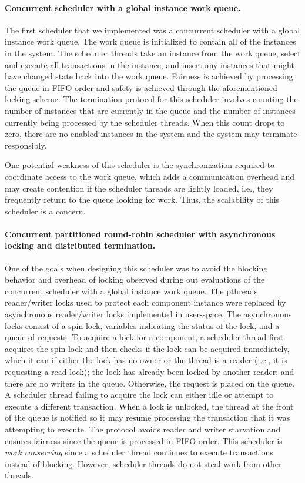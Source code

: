 \paragraph{Concurrent scheduler with a global instance work queue.}
The first scheduler that we implemented was a concurrent scheduler with a global instance work queue.
The work queue is initialized to contain all of the instances in the system.
The scheduler threads take an instance from the work queue, select and execute all transactions in the instance, and insert any instances that might have changed state back into the work queue.
Fairness is achieved by processing the queue in FIFO order and safety is achieved through the aforementioned locking scheme.
The termination protocol for this scheduler involves counting the number of instances that are currently in the queue and the number of instances currently being processed by the scheduler threads.
When this count drops to zero, there are no enabled instances in the system and the system may terminate responsibly.

One potential weakness of this scheduler is the synchronization required to coordinate access to the work queue, which adds a communication overhead and may create contention if the scheduler threads are lightly loaded, i.e., they frequently return to the queue looking for work.
Thus, the scalability of this scheduler is a concern.

\paragraph{Concurrent partitioned round-robin scheduler with asynchronous locking and distributed termination.}
One of the goals when designing this scheduler was to avoid the blocking behavior and overhead of locking observed during out evaluations of the concurrent scheduler with a global instance work queue.
The pthreads reader/writer locks used to protect each component instance were replaced by asynchronous reader/writer locks implemented in user-space.
The asynchronous locks consist of a spin lock, variables indicating the status of the lock, and a queue of requests.
To acquire a lock for a component, a scheduler thread first acquires the spin lock and then checks if the lock can be acquired immediately, which it can if either the lock has no owner or the thread is a reader (i.e., it is requesting a read lock); the lock has already been locked by another reader; and there are no writers in the queue.
Otherwise, the request is placed on the queue.
A scheduler thread failing to acquire the lock can either idle or attempt to execute a different transaction.
When a lock is unlocked, the thread at the front of the queue is notified so it may resume processing the transaction that it was attempting to execute.
The protocol avoids reader and writer starvation and ensures fairness since the queue is processed in FIFO order.
This scheduler is \emph{work conserving} since a scheduler thread continues to execute transactions instead of blocking.
However, scheduler threads do not steal work from other threads.

